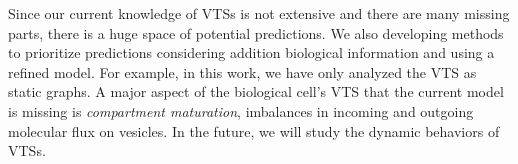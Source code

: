 Since our current knowledge of VTSs is not extensive and there are many missing parts,
there is a huge space of potential predictions.
%
We also developing methods to prioritize predictions considering addition biological
information and using a refined model.
%
For example, in this work, we have only analyzed the VTS as static graphs. A major aspect of the biological cell’s VTS that the current model is missing is \textit{compartment maturation}, imbalances in incoming and outgoing molecular flux on vesicles.
%
In the future, we will study the dynamic behaviors of VTSs.

